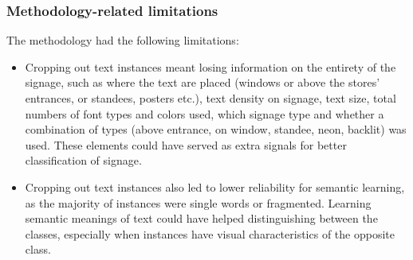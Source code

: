 \subsubsection{Methodology-related limitations}
The methodology had the following limitations:

\begin{itemize}
    \item Cropping out text instances meant losing information on the entirety of the signage, such as where the text are placed (windows or above the stores' entrances, or standees, posters etc.), text density on signage, text size, total numbers of font types and colors used, which signage type and whether a combination of types (above entrance, on window, standee, neon, backlit) was used. These elements could have served as extra signals for better classification of signage.
    
    \item Cropping out text instances also led to lower reliability for semantic learning, as the majority of instances were single words or fragmented. Learning semantic meanings of text could have helped distinguishing between the classes, especially when instances have visual characteristics of the opposite class.
    
\end{itemize}

